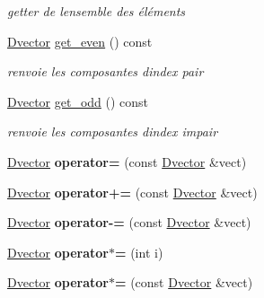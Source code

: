 \begin{DoxyCompactItemize}
\begin{DoxyCompactList}\small\item\em getter de l\textquotesingle{}ensemble des éléments \end{DoxyCompactList}\item 
\mbox{\label{class_dvector_a8f274704d0c2ffe625a9f56d5729158b}} 
\hyperlink{class_dvector}{Dvector} \hyperlink{class_dvector_a8f274704d0c2ffe625a9f56d5729158b}{get\+\_\+even} () const
\begin{DoxyCompactList}\small\item\em renvoie les composantes d\textquotesingle{}index pair \end{DoxyCompactList}\item 
\mbox{\label{class_dvector_a190c6403a5318451b23ee276581c2618}} 
\hyperlink{class_dvector}{Dvector} \hyperlink{class_dvector_a190c6403a5318451b23ee276581c2618}{get\+\_\+odd} () const
\begin{DoxyCompactList}\small\item\em renvoie les composantes d\textquotesingle{}index impair \end{DoxyCompactList}\item 
\mbox{\label{class_dvector_a9c72bc1fb55c36844d55b996127e7be7}} 
\hyperlink{class_dvector}{Dvector} {\bfseries operator=} (const \hyperlink{class_dvector}{Dvector} \&vect)
\item 
\mbox{\label{class_dvector_a75c5523da365463f4efa812a44596409}} 
\hyperlink{class_dvector}{Dvector} {\bfseries operator+=} (const \hyperlink{class_dvector}{Dvector} \&vect)
\item 
\mbox{\label{class_dvector_a472907173bf8eaf0aaa0ff9bde8f125e}} 
\hyperlink{class_dvector}{Dvector} {\bfseries operator-\/=} (const \hyperlink{class_dvector}{Dvector} \&vect)
\item 
\mbox{\label{class_dvector_af31badc85a41de4257f0b2a870c5cc84}} 
\hyperlink{class_dvector}{Dvector} {\bfseries operator$\ast$=} (int i)
\item 
\mbox{\label{class_dvector_ad4ead0c93b44fc1d1b31e58d4f7e0a78}} 
\hyperlink{class_dvector}{Dvector} {\bfseries operator$\ast$=} (const \hyperlink{class_dvector}{Dvector} \&vect)

\end{DoxyCompactItemize}
